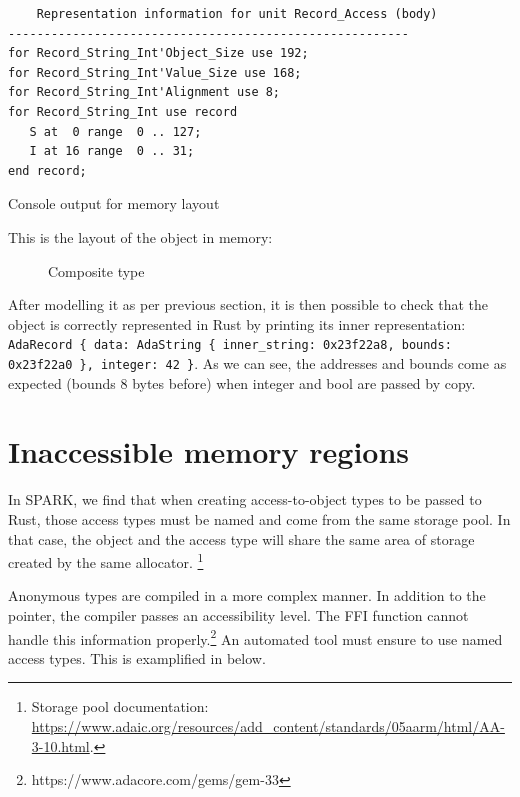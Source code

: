\documentclass[nomenclature, english, bibtex]{kththesis}
\newcommand{\inlinecode}[1]{\texttt{#1}}
\begin{document}
{\begin{listing}[!ht]
\begin{verbatim}
    Representation information for unit Record_Access (body)
--------------------------------------------------------
for Record_String_Int'Object_Size use 192;
for Record_String_Int'Value_Size use 168;
for Record_String_Int'Alignment use 8;
for Record_String_Int use record
   S at  0 range  0 .. 127;
   I at 16 range  0 .. 31;
end record;
\end{verbatim}
\caption[Memory layout output]{Console output for memory layout}
\label{lst:gnatrj}
\end{listing}
\FloatBarrier

This is the layout of the object in memory:

\begin{figure}[ht!]
    \centering
  \caption{Composite type}
  \label{fig:memlayout}
\end{figure}

After modelling it as per previous section, it is then possible to check that the object is correctly represented in Rust by printing its inner representation: 
\inlinecode{AdaRecord \{ data: AdaString \{ inner\_string: 0x23f22a8, bounds: 0x23f22a0 \}, integer: 42 \}}. As we can see, the addresses and bounds come as expected (bounds 8 bytes before) when integer and bool are passed by copy.

\section{Inaccessible memory regions}

In SPARK, we find that when creating access-to-object types to be passed to Rust, those access types must be named and come from the same storage pool. In that case, the object and the access type will share the same area of storage created by the same allocator. \footnote{Storage pool documentation: \url{https://www.adaic.org/resources/add_content/standards/05aarm/html/AA-3-10.html}.}  

Anonymous types are compiled in a more complex manner. In addition to the pointer, the compiler passes an accessibility level. The \gls{FFI} function cannot handle this information properly.\footnote{https://www.adacore.com/gems/gem-33} An automated tool must ensure to use named access types. This is examplified in  below.


}
\end{document}
